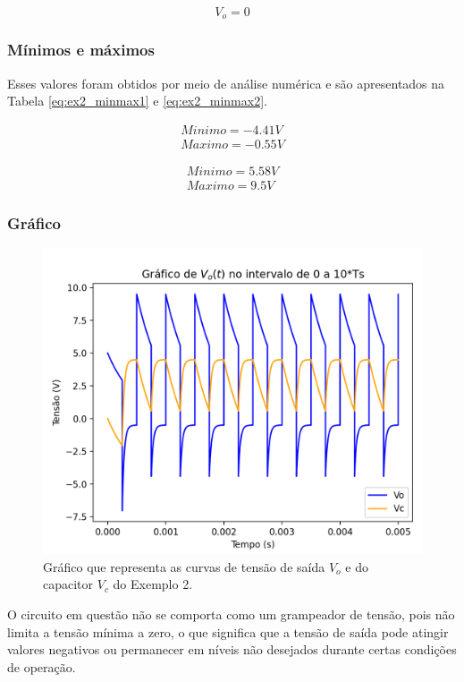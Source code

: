 \begin{equation}
    \tag*{Estado 2}
    V_o = 0
\end{equation}

\subsubsection{Mínimos e máximos}

Esses valores foram obtidos por meio de análise numérica e são apresentados na Tabela \ref{eq:ex2_minmax1} e \ref{eq:ex2_minmax2}.

\begin{equation}
    \label{eq:ex2_minmax1}
    \tag*{Estado 1}
    \begin{aligned}
        Minimo = -4.41 V \\
        Maximo = -0.55 V
    \end{aligned}
\end{equation}

\begin{equation}
    \label{eq:ex2_minmax2}
    \tag*{Estado 2}
    \begin{aligned}
        Minimo = 5.58 V \\
        Maximo = 9.5 V
    \end{aligned}
\end{equation}

\subsubsection{Gráfico}

\begin{figure}[h]
    \label{fig:ex2_numerico}
    \centering
    \includegraphics[width=1\columnwidth]{images/grafico_exemplo2.png}
    \caption{Gráfico que representa as curvas de tensão de saída $V_o$ e do capacitor $V_c$ do Exemplo 2.}
\end{figure}

O circuito em questão não se comporta como um grampeador de tensão, pois não limita a tensão mínima a zero, o que significa que a tensão de saída pode atingir valores negativos ou permanecer em níveis não desejados durante certas condições de operação.